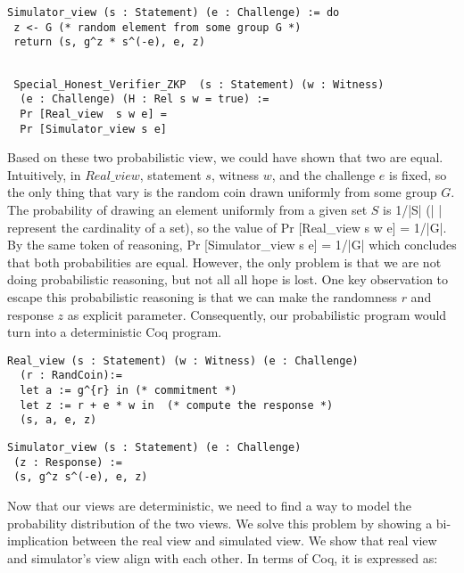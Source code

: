 \begin{verbatim}
Simulator_view (s : Statement) (e : Challenge) := do
 z <- G (* random element from some group G *)
 return (s, g^z * s^(-e), e, z)
\end{verbatim}

\begin{verbatim}

 Special_Honest_Verifier_ZKP  (s : Statement) (w : Witness) 
  (e : Challenge) (H : Rel s w = true) := 
  Pr [Real_view  s w e] = 
  Pr [Simulator_view s e]

\end{verbatim}

\noindent
Based on these two probabilistic view, we could have shown that two are equal. Intuitively, 
in $Real\_view$, statement $s$, witness $w$, and the challenge $e$ is fixed, so the only thing that vary is the
random coin drawn uniformly from some group $G$. The probability of drawing an element uniformly 
from a given set $S$ is 1/|S| (| | represent the cardinality of a set), so the value of Pr [Real\_view  s w e] = 1/|G|. 
By the same token of reasoning, Pr [Simulator\_view s e] = 1/|G| which concludes that 
both probabilities are equal. However, the only problem is that we are not doing probabilistic reasoning, 
but not all all hope is lost.
One key observation to escape this probabilistic reasoning is 
that we can make the randomness $r$ and response $z$ as 
explicit parameter. Consequently, our probabilistic program would turn into 
a deterministic Coq program. 


\begin{verbatim}
Real_view (s : Statement) (w : Witness) (e : Challenge) 
  (r : RandCoin):=
  let a := g^{r} in (* commitment *)
  let z := r + e * w in  (* compute the response *)
  (s, a, e, z)
\end{verbatim}


\begin{verbatim}
Simulator_view (s : Statement) (e : Challenge) 
 (z : Response) :=
 (s, g^z s^(-e), e, z)

\end{verbatim}



Now that our views are deterministic, we need to find a way to model 
the probability distribution of the two views. We solve this problem 
by showing a bi-implication  between  the real view and simulated view.
We show that real view and simulator's view align with each other. 
In terms of Coq, it is expressed as:

